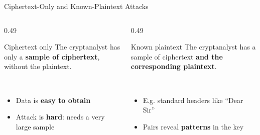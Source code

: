 \documentclass[aspectratio=169,11pt,xcolor={table}]{beamer}
\newcommand{\bad}[1]{\textcolor{brick}{\textbf{#1}}}
\newcommand{\good}[1]{\textcolor{leaf}{\textbf{#1}}}
\begin{document}
\begin{frame}{Ciphertext-Only and Known-Plaintext Attacks}
  \begin{columns}[T]
    \begin{column}{0.49\textwidth}
      \begin{block}{Ciphertext only}
        \small The cryptanalyst has only a \textbf{sample of ciphertext}, without the plaintext.
      \end{block}
      \centering
      \\[1mm]
      \begin{itemize}\scriptsize
        \item Data is \good{easy to obtain}
        \item Attack is \bad{hard}: needs a very large sample
      \end{itemize}
    \end{column}
    \begin{column}{0.49\textwidth}
      \begin{block}{Known plaintext}
        \small The cryptanalyst has a sample of ciphertext \textbf{and the corresponding plaintext}.
      \end{block}
      \centering
      \\[1mm]
      \begin{itemize}\scriptsize
        \item E.g. standard headers like ``Dear Sir''
        \item Pairs reveal \textbf{patterns} in the key
      \end{itemize}
    \end{column}
  \end{columns}
\end{frame}
\end{document}
